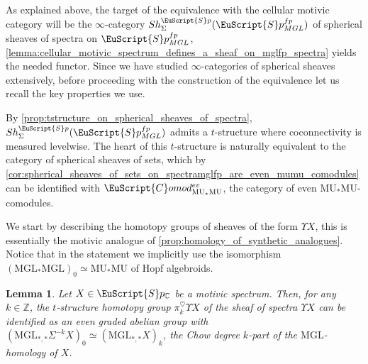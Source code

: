 \documentclass[oneside,a4paper]{amsart}
\newcommand{\euscr}[1]{\EuScript{#1}} %
\newcommand{\MU}{\mathrm{MU}} %
\newcommand{\MGL}{\mathrm{MGL}} %
\newcommand{\spectra}{\euscr{S}p} %
\newcommand{\cspectra}{\euscr{S}p_{\mathbb{C}}} %
\newcommand{\spectramglfp}{\spectra_{MGL}^{fp}} %
\newcommand{\Comod}{\euscr{C}omod} %
\newcommand{\ComodMU}{\Comod_{\MU_{*}\MU}} %
\theoremstyle{plain}
\newtheorem{lemma}[thm]{Lemma}
\theoremstyle{definition}
\theoremstyle{remark}
\begin{document}
As explained above, the target of the equivalence with the cellular motivic category will be the $\infty$-category $Sh_{\Sigma}^{\spectra}(\spectramglfp)$ of spherical sheaves of spectra on $\spectramglfp$, \cref{lemma:cellular_motivic_spectrum_defines_a_sheaf_on_mglfp_spectra} yields the needed functor. Since we have studied $\infty$-categories of spherical sheaves extensively, before proceeding with the construction of the equivalence let us recall the key properties we use. 

By \cref{prop:tstructure_on_spherical_sheaves_of_spectra}, $Sh_{\Sigma}^{\spectra}(\spectramglfp)$ admits a $t$-structure where coconnectivity is measured levelwise. The heart of this $t$-structure is naturally equivalent to the category of spherical sheaves of sets, which by \cref{cor:spherical_sheaves_of_sets_on_spectramglfp_are_even_mumu_comodules} can be identified with $\ComodMU^{ev}$, the category of even $\MU_{*}\MU$-comodules. 

We start by describing the homotopy groups of sheaves of the form $\Upsilon X$, this is essentially the motivic analogue of \cref{prop:homology_of_synthetic_analogues}. Notice that in the statement we implicitly use the isomorphism $(\MGL_{*}\MGL)_{0} \simeq \MU_{*}\MU$ of Hopf algebroids.

\begin{lemma}
\label{lemma:homotopy_groups_of_yoneda_embedding_of_motivic_spectra_as_an_mumu_comodule}
Let $X \in \cspectra$ be a motivic spectrum. Then, for any $k \in \mathbb{Z}$, the $t$-structure homotopy group $\pi^{\heartsuit}_{k} \Upsilon X$ of the sheaf of spectra $\Upsilon X$ can be identified as an even graded abelian group with $(\MGL_{*, *} \Sigma^{-k} X) _{0} \simeq (\MGL_{*,*}X)_{k}$, the Chow degree $k$-part of the $\MGL$-homology of $X$. 
\end{lemma}
\end{document}
